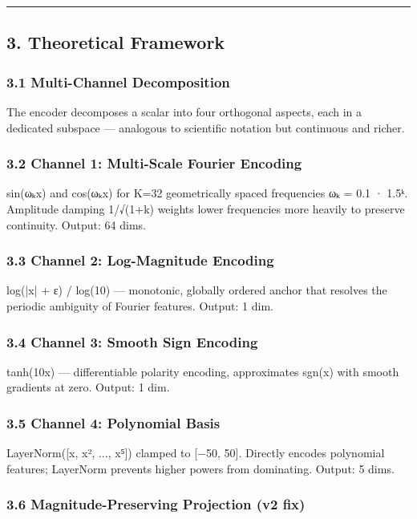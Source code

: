 \documentclass[11pt]{article}
\begin{document}
\noindent\rule{\textwidth}{0.4pt}


\subsection*{3. Theoretical Framework}


\subsubsection*{3.1 Multi-Channel Decomposition}


The encoder decomposes a scalar into four orthogonal aspects, each in a dedicated subspace — analogous to scientific notation but continuous and richer.


\subsubsection*{3.2 Channel 1: Multi-Scale Fourier Encoding}


sin(ωₖx) and cos(ωₖx) for K=32 geometrically spaced frequencies ωₖ = 0.1 · 1.5ᵏ. Amplitude damping 1/√(1+k) weights lower frequencies more heavily to preserve continuity. Output: 64 dims.


\subsubsection*{3.3 Channel 2: Log-Magnitude Encoding}


log(|x| + ε) / log(10) — monotonic, globally ordered anchor that resolves the periodic ambiguity of Fourier features. Output: 1 dim.


\subsubsection*{3.4 Channel 3: Smooth Sign Encoding}


tanh(10x) — differentiable polarity encoding, approximates sgn(x) with smooth gradients at zero. Output: 1 dim.


\subsubsection*{3.5 Channel 4: Polynomial Basis}


LayerNorm([x, x², ..., x⁵]) clamped to [−50, 50]. Directly encodes polynomial features; LayerNorm prevents higher powers from dominating. Output: 5 dims.


\subsubsection*{3.6 Magnitude-Preserving Projection (v2 fix)}
\end{document}
